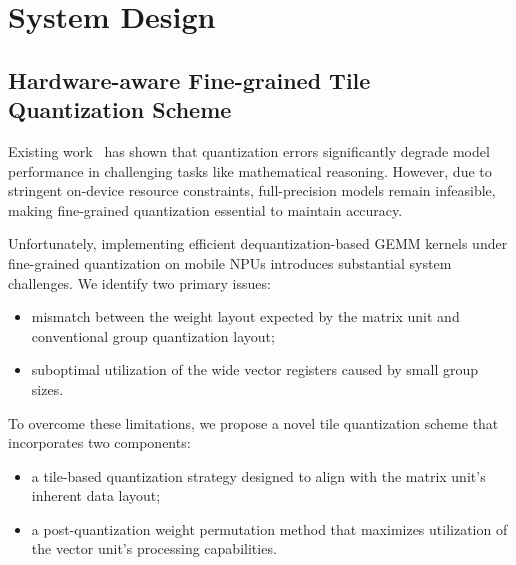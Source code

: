 \section{System Design}

\subsection{Hardware-aware Fine-grained Tile Quantization Scheme}

Existing work~\cite{quantization-hurts-reasoning,quantization-meets-reasoning} has shown that quantization errors significantly degrade model performance in challenging tasks like mathematical reasoning. However, due to stringent on-device resource constraints, full-precision models remain infeasible, making fine-grained quantization essential to maintain accuracy.

Unfortunately, implementing efficient dequantization-based GEMM kernels under fine-grained quantization on mobile NPUs introduces substantial system challenges. We identify two primary issues:

\begin{itemize}
    \item mismatch between the weight layout expected by the matrix unit and conventional group quantization layout;
    \item suboptimal utilization of the wide vector registers caused by small group sizes.
\end{itemize}

To overcome these limitations, we propose a novel tile quantization scheme that incorporates two components:

\begin{itemize}
    \item a tile-based quantization strategy designed to align with the matrix unit's inherent data layout;
    \item a post-quantization weight permutation method that maximizes utilization of the vector unit's processing capabilities.
\end{itemize}



